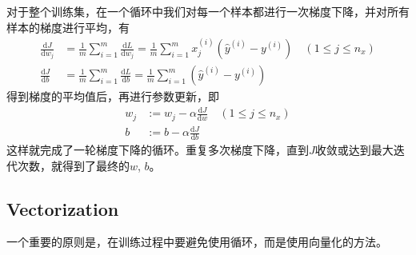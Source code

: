	\vspace{0.5\baselineskip}
	对于整个训练集，在一个循环中我们对每一个样本都进行一次梯度下降，并对所有样本的梯度进行平均，有
	\begin{equation}
		\begin{aligned}
			\frac{\mathrm{d}J}{\mathrm{d}w_j} &= \frac{1}{m} \sum_{i=1}^{m} \frac{\mathrm{d}L}{\mathrm{d}w_j} = \frac{1}{m} \sum_{i=1}^{m} x_j^{(i)} (\hat{y}^{(i)} - y^{(i)}) \quad (1 \leqslant j \leqslant n_x)\\
			\frac{\mathrm{d}J}{\mathrm{d}b} &= \frac{1}{m} \sum_{i=1}^{m} \frac{\mathrm{d}L}{\mathrm{d}b} = \frac{1}{m} \sum_{i=1}^{m} (\hat{y}^{(i)} - y^{(i)})
		\end{aligned}
	\end{equation}
	得到梯度的平均值后，再进行参数更新，即
	\begin{equation}
		\begin{aligned}
		w_j &:= w_j - \alpha \frac{\mathrm{d}J}{\mathrm{d}w} \quad (1 \leqslant j \leqslant n_x) \\
		b &:= b - \alpha \frac{\mathrm{d}J}{\mathrm{d}b}
		\end{aligned} 
	\end{equation}
	这样就完成了一轮梯度下降的循环。重复多次梯度下降，直到$J$收敛或达到最大迭代次数，就得到了最终的$w$, $b$。

	\subsection{Vectorization}

	一个重要的原则是，在训练过程中要避免使用循环，而是使用向量化的方法。

